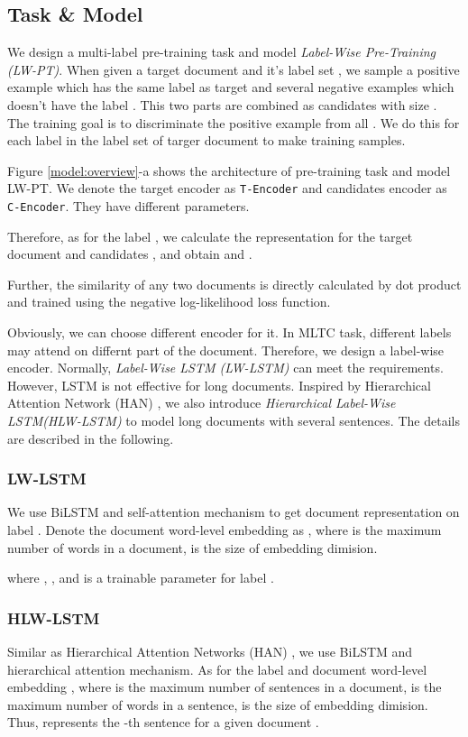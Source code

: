 \documentclass[runningheads]{llncs}
\begin{document}
\subsection{Task \& Model}
We design a multi-label pre-training task and model \textit{Label-Wise Pre-Training (LW-PT)}. When given a target document  and it's label set , we sample a positive example  which has the same label  as target and several negative examples  which doesn't have the label . This two parts are combined as candidates  with size . The training goal is to discriminate the positive example from all . We do this for each label  in the label set of targer document to make training samples.

Figure \ref{model:overview}-a shows the architecture of pre-training task and model LW-PT. We denote the target encoder as \texttt{T-Encoder} and candidates encoder as \texttt{C-Encoder}. They have different parameters. 

 Therefore, as for the label , we calculate the representation for the target document  and candidates , and obtain  and .


Further, the similarity of any two documents is directly calculated by dot product and trained using the negative log-likelihood loss function.


Obviously, we can choose different encoder for it. In MLTC task, different labels may attend on differnt part of the document. Therefore, we design a label-wise encoder. Normally, \textit{Label-Wise LSTM (LW-LSTM)} can meet the requirements. However, LSTM is not effective for long documents. Inspired by Hierarchical Attention Network (HAN) \cite{yang2016hierarchical}, we also introduce \textit{Hierarchical Label-Wise LSTM(HLW-LSTM)} to model long documents with several sentences. The details are described in the following.

\subsubsection{LW-LSTM}
We use BiLSTM and self-attention mechanism to get document representation  on label . Denote the document word-level embedding as , where  is the maximum number of words in a document,  is the size of embedding dimision.

where , , and  is a trainable parameter for label .

\subsubsection{HLW-LSTM}
Similar as Hierarchical Attention Networks (HAN) \cite{yang2016hierarchical}, we use BiLSTM and hierarchical attention mechanism. As for the label  and document word-level embedding , where  is the maximum number of sentences in a document,  is the maximum number of words in a sentence,  is the size of embedding dimision. Thus,  represents the -th sentence for a given document .
\end{document}

